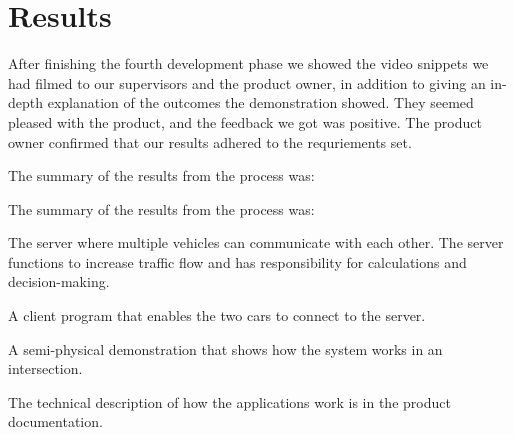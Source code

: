 \section{Results}
After finishing the fourth development phase we showed the video snippets we had filmed to our supervisors and the product owner, in addition to giving an in-depth explanation of the outcomes the demonstration showed. They seemed pleased with the product, and the feedback we got was positive. The product owner confirmed that our results adhered to the requriements set.

The summary of the results from the process was:

The summary of the results from the process was:

The server where multiple vehicles can communicate with each other. The server functions to increase traffic flow and has responsibility for calculations and decision-making. 

A client program that enables the two cars to connect to the server. 

A semi-physical demonstration that shows how the system works in an intersection.

The technical description of how the applications work is in the product documentation. 





